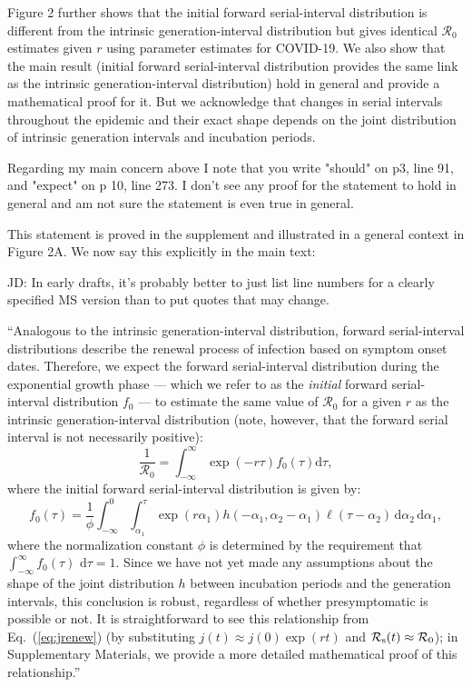 \documentclass[12pt]{article}
\newcommand{\eref}[1]{Eq.~(\ref{eq:#1})}
\newcommand{\Rx}[1]{\ensuremath{{\cal R}_{#1}}}
\newcommand{\Ro}{\ensuremath{{\mathcal R}_{0}}\xspace}
\newcommand{\Rs}{\Rx{\mathrm{s}}}
\newcommand{\dd}[1]{\ensuremath{\, \mathrm{d}#1}}
\newcommand{\dtau}{\dd{\tau}}
\newcommand{\revtext}{\textsf}
\newcommand{\pinf}{\ensuremath{\alpha_1}} %
\newcommand{\sinf}{\ensuremath{\alpha_2}} %
\newcommand{\idist}{\ell} %
\begin{document}
Figure 2 further shows that the initial forward serial-interval distribution is different from the intrinsic generation-interval distribution but gives identical \Ro estimates given $r$ using parameter estimates for COVID-19. 
We also show that the main result (initial forward serial-interval distribution provides the same link as the intrinsic generation-interval distribution) hold in general and provide a mathematical proof for it. But we acknowledge that changes in serial intervals throughout the epidemic and their exact shape depends on the joint distribution of intrinsic generation intervals and incubation periods.

\revtext{Regarding my main concern above I note that you write "should" on p3, line 91, and "expect" on p 10, line 273. I don't see any proof for the statement to hold in general and am not sure the statement is even true in general.}

This statement is proved in the supplement and illustrated in a general context in Figure 2A. We now say this explicitly in the main text:

JD: In early drafts, it's probably better to just list line numbers for a clearly specified MS version than to put quotes that may change.

``Analogous to the intrinsic generation-interval distribution, 
forward serial-interval distributions describe the renewal process of infection based on symptom onset dates.
Therefore, we expect the forward serial-interval distribution during the exponential growth phase --- which we refer to as the \emph{initial} forward serial-interval distribution $f_0$ --- to estimate the same value of \Ro for a given $r$ as the intrinsic generation-interval distribution (note, however, that the forward serial interval is not necessarily positive):
\begin{equation}
\frac{1}{\Ro} = \int_{-\infty}^\infty \exp(-r\tau) f_{0}(\tau) \mathrm{d} \tau,
\label{eq:Rforward}
\end{equation}
where the initial forward serial-interval distribution is given by:
\begin{equation}
f_{0}(\tau) = \frac{1}{\phi} \int_{-\infty}^{0} \int_{\pinf}^{\tau} \exp(r \pinf) h(-\pinf, \sinf - \pinf) \idist(\tau - \sinf) \, \mathrm{d}\sinf\,\mathrm{d}\pinf,
\label{eq:initialSI}
\end{equation}
where the normalization constant $\phi$ is determined by the
requirement that $\int_{-\infty}^\infty f_{0}(\tau)\,\dtau=1$.
Since we have not yet made any assumptions about the shape of the joint distribution $h$ between incubation periods and the generation intervals, this conclusion is robust, regardless of whether presymptomatic is possible or not.
It is straightforward to see this relationship from \eref{jrenew} (by substituting $j(t) \approx j(0) \exp(rt)$ and $\Rs(t) \approx \Ro$);
in Supplementary Materials, we provide a more detailed mathematical proof of this relationship.''
\end{document}
